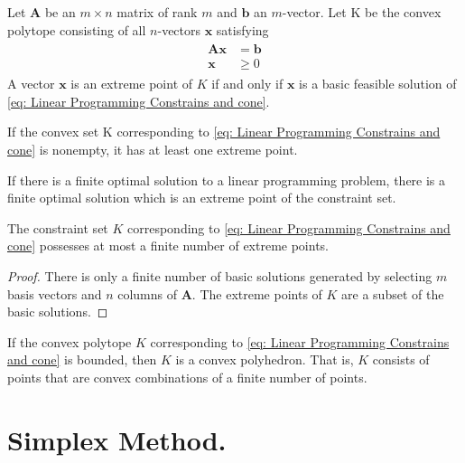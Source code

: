 \begin{theorem}
	Let $\mathbf{A}$ be an $m\times n$ matrix of rank $m$ and $\mathbf{b}$ an $m$-vector. Let K be the convex polytope consisting of all $n$-vectors $\mathbf{x}$ satisfying
	\begin{align}
		\begin{array}{cc}
		\mathbf{A}\mathbf{x}&=\mathbf{b} \\
		\mathbf{x}&\geq 0		
		\end{array}
	\label{eq: Linear Programming Constrains and cone}
	\end{align}
	A vector $\mathbf{x}$ is an extreme point of $K$ if and only if $\mathbf{x}$ is a basic feasible solution of \eqref{eq: Linear Programming Constrains and cone}.
\end{theorem}
\begin{corollary}
If the convex set K corresponding to \eqref{eq: Linear Programming Constrains and cone} is nonempty, it has at least one extreme point.
\end{corollary}

\begin{corollary}
If there is a finite optimal solution to a linear programming problem, there is a finite optimal solution which is an extreme point of the constraint set.
\end{corollary}

\begin{corollary}
The constraint set $K$ corresponding to \eqref{eq: Linear Programming Constrains and cone} possesses at most a finite number of extreme points.
	\begin{proof}
	There is only a finite number of basic solutions generated by selecting $m$ basis vectors and $n$ columns of $\mathbf{A}$. The extreme points of $K$ are a subset of the basic solutions.
	\end{proof}
\end{corollary}

\begin{corollary}
	If the convex polytope $K$ corresponding to \eqref{eq: Linear Programming Constrains and cone} is bounded, then $K$ is a convex polyhedron. That is, $K$ consists of points that are convex combinations of a finite number of points.
\end{corollary}

\section{Simplex Method.}

